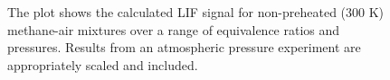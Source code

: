 \begin{figure}

\centering



\caption[Methane-air flame results - I]{The plot shows the calculated LIF signal for non-preheated (300 K) methane-air mixtures over a range of equivalence ratios and pressures. Results from an atmospheric pressure experiment are appropriately scaled and included.}

\label{fig:01-300}

\end{figure}
